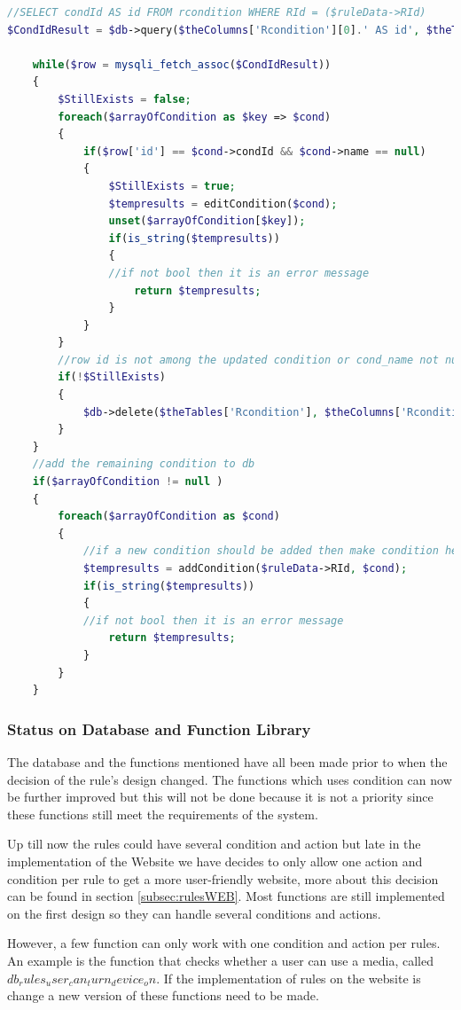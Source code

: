 \begin{lstlisting}[language=PHP, label=code:UpdateRules, caption=editRule code sample]
//SELECT condId AS id FROM rcondition WHERE RId = ($ruleData->RId)
$CondIdResult = $db->query($theColumns['Rcondition'][0].' AS id', $theTables['Rcondition'], $theColumns['Rcondition'][1] . " = " . $ruleData->RId );
				
	while($row = mysqli_fetch_assoc($CondIdResult))
	{
		$StillExists = false;
		foreach($arrayOfCondition as $key => $cond)
		{
			if($row['id'] == $cond->condId && $cond->name == null)				//edit the condition in db
			{
				$StillExists = true;
				$tempresults = editCondition($cond);
				unset($arrayOfCondition[$key]);
				if(is_string($tempresults))
				{
				//if not bool then it is an error message
					return $tempresults;
				}
			}	
		}
		//row id is not among the updated condition or cond_name not null so delete 
		if(!$StillExists)
		{
			$db->delete($theTables['Rcondition'], $theColumns['Rcondition'][0] . " = " .$row['id']);
		}
	}
	//add the remaining condition to db
	if($arrayOfCondition != null )
	{
		foreach($arrayOfCondition as $cond)
		{
			//if a new condition should be added then make condition here
			$tempresults = addCondition($ruleData->RId, $cond);
			if(is_string($tempresults))
			{
			//if not bool then it is an error message
				return $tempresults;
			}
		}
	}
\end{lstlisting}

\subsubsection{Status on Database and Function Library}

The database and the functions mentioned have all been made prior to when the decision of the rule's design changed. The functions which uses condition can now be further improved but this will not be done because it is not a priority since these functions still meet the requirements of the system.

Up till now the rules could have several condition and action but late in the implementation of the Website we have decides to only allow one action and condition per rule to get a more user-friendly website, more about this decision can be found in section \vref{subsec:rulesWEB}. Most functions are still implemented on the first design so they can handle several conditions and actions. 

However, a few function can only work with one condition and action per rules. An example is the function that checks whether a user can use a media, called $db_rules_user_can_turn_device_on$. If the implementation of rules on the website is change a new version of these functions need to be made.
